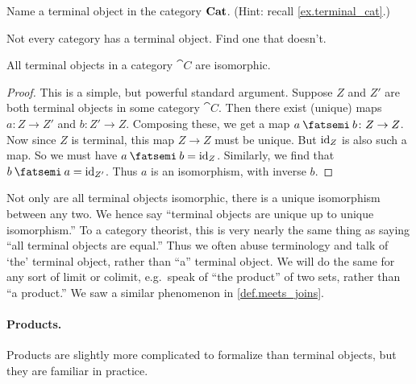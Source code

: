 \documentclass[7Sketches]{subfiles}
\begin{document}
\begin{exercise}%
\label{exc.terminal_cat}
Name a terminal object in the category $\mathbf{Cat}$. (Hint: recall
\cref{ex.terminal_cat}.)
\end{exercise}

\begin{exercise}%
\label{exc.cat_wo_terminal}
Not every category has a terminal object. Find one that doesn't.
\end{exercise}

\begin{proposition}
All terminal objects in a category $\cat{C}$ are isomorphic.
\end{proposition}
\begin{proof}
This is a simple, but powerful standard argument. Suppose $Z$ and $Z'$ are both
terminal objects in some category $\cat{C}$. Then there exist (unique) maps
$a\colon Z \to Z'$ and $b\colon Z' \to Z$. Composing these, we get a map $a\cp
b\colon Z \to Z$. Now since $Z$ is terminal, this map $Z \to Z$ must be unique.
But $\mathrm{id}_Z$ is also such a map. So we must have $a\cp b = \id_Z$.  Similarly, we
find that $b \cp a= \id_{Z'}$. Thus $a$ is an isomorphism, with inverse $b$.
\end{proof}

\begin{remark}%
\label{rem.the_vs_a}%
%
Not only are all terminal objects isomorphic, there is a unique isomorphism between any two. We hence say ``terminal objects are unique up to unique isomorphism.'' To a category theorist, this is
very nearly the same thing as saying ``all terminal objects are equal.'' Thus we often abuse terminology and talk of `the' terminal object, rather than ``a'' terminal
object. We will do the same for any sort of limit or colimit, e.g.\ speak of ``the product'' of two sets, rather than ``a product.'' We saw a similar phenomenon in \cref{def.meets_joins}.
\end{remark}

\paragraph{Products.} Products are slightly more complicated to formalize than terminal objects, but they are familiar in practice.
\end{document}

